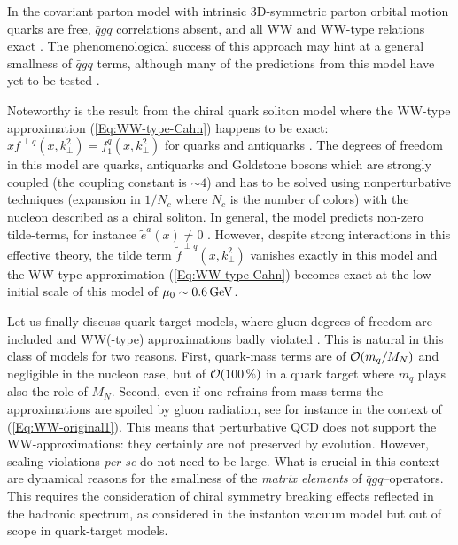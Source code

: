 \documentclass[a4paper,11pt]{article}
\def\kperp{k_\perp}
\begin{document}
In the covariant parton model with intrinsic 3D-symmetric parton 
orbital motion \cite{Zavada:1996kp}  quarks are free, $\bar{q}gq$ 
correlations absent, and all WW and WW-type relations exact
\cite{Efremov:2010mt,Efremov:2009ze}.
The phenomenological success of this approach \cite{Zavada:1996kp} may 
hint at a general smallness of $\bar{q}gq$ terms, although many of the 
predictions from this model have yet to be tested \cite{Efremov:2010mt}.

Noteworthy is the result from the chiral quark soliton
model where the WW-type approximation (\ref{Eq:WW-type-Cahn})
happens to be exact: $xf^{\perp q}(x,\kperp^2)=f_{1}^q(x,\kperp^2)$
for quarks and antiquarks \cite{Lorce:2014hxa}. The degrees of freedom
in this model are quarks, antiquarks and Goldstone bosons which are 
strongly coupled (the coupling constant is $\sim 4$) and has to be
solved using nonperturbative techniques (expansion in $1/N_c$ where
$N_c$ is the number of colors) with the nucleon described as a 
chiral soliton. In general, the model predicts non-zero tilde-terms, for 
instance $\tilde{e}^a(x)\neq 0$ 
\cite{Schweitzer:2003uy,Ohnishi:2003mf,Cebulla:2007ej}.
However, despite strong interactions in this effective theory, the tilde 
term $\tilde{f}^{\perp q}(x,\kperp^2)$ vanishes exactly in this model 
\cite{Lorce:2014hxa} and the WW-type approximation (\ref{Eq:WW-type-Cahn})
becomes exact at the low initial scale of this model of 
$\mu_0\sim 0.6\,{\rm GeV}$.

Let us finally discuss quark-target models, 
where gluon degrees of freedom are included and WW(-type)
approximations badly violated
\cite{Kundu:2001pk,Schlegel:2004rg,Meissner:2007rx,Mukherjee:2009uy}.
This is natural in this class of models for two
reasons. First, quark-mass terms are of ${\cal O}(m_q/M_N)$ 
and negligible in the nucleon case, but of ${\cal O}(100\,\%)$
in a quark target where $m_q$ plays also the role of $M_N$. 
Second, even if one refrains from mass terms the approximations are 
spoiled by gluon radiation, see for instance \cite{Harindranath:1997qn} 
in the context of (\ref{Eq:WW-original1}).
This means that perturbative QCD does not support the WW-approximations:
they certainly are not preserved by evolution. However, scaling violations
{\it per se} do not need to be large. What is crucial in this context are 
dynamical reasons for the smallness of the {\sl matrix elements} of
$\bar{q}gq$--operators. This requires the consideration of chiral symmetry 
breaking effects reflected in the hadronic spectrum, as considered in the
instanton vacuum model \cite{Balla:1997hf,Dressler:1999hc} but 
out of scope in quark-target models.
\end{document}
